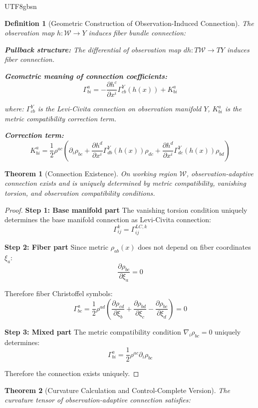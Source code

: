 \documentclass[a4paper,12pt]{extarticle}
\newtheorem{theorem}{Theorem}
\newtheorem{definition}{Definition}
\theoremstyle{definition}
\begin{document}
\begin{CJK}{UTF8}{gbsn}
\begin{definition}[Geometric Construction of Observation-Induced Connection]
The observation map $h: \mathcal{W} \to Y$ induces fiber bundle connection:

\textbf{Pullback structure:}
The differential of observation map $dh: T\mathcal{W} \to TY$ induces fiber connection.

\textbf{Geometric meaning of connection coefficients:}
$$\Gamma^a_{bi} = -\frac{\partial h^c}{\partial x^i} \Gamma^Y_{cb}(h(x)) + K^a_{bi}$$

where: $\Gamma^Y_{cb}$ is the Levi-Civita connection on observation manifold $Y$, $K^a_{bi}$ is the metric compatibility correction term.

\textbf{Correction term:}
$$K^a_{bi} = \frac{1}{2}\rho^{ac}\left(\partial_i \rho_{bc} + \frac{\partial h^d}{\partial x^i} \Gamma^Y_{db}(h(x)) \rho_{dc} + \frac{\partial h^d}{\partial x^i} \Gamma^Y_{dc}(h(x)) \rho_{bd}\right)$$
\end{definition}

\begin{theorem}[Connection Existence]
On working region $\mathcal{W}$, observation-adaptive connection exists and is uniquely determined by metric compatibility, vanishing torsion, and observation compatibility conditions.
\end{theorem}

\begin{proof}
\textbf{Step 1: Base manifold part}
The vanishing torsion condition uniquely determines the base manifold connection as Levi-Civita connection:
$$\Gamma^k_{ij} = \Gamma^{LC,k}_{ij}$$

\textbf{Step 2: Fiber part}
Since metric $\rho_{ab}(x)$ does not depend on fiber coordinates $\xi_a$:
$$\frac{\partial \rho_{bc}}{\partial \xi_a} = 0$$

Therefore fiber Christoffel symbols:
$$\Gamma^a_{bc} = \frac{1}{2}\rho^{ad}\left(\frac{\partial \rho_{cd}}{\partial \xi_b} + \frac{\partial \rho_{bd}}{\partial \xi_c} - \frac{\partial \rho_{bc}}{\partial \xi_d}\right) = 0$$

\textbf{Step 3: Mixed part}
The metric compatibility condition $\nabla_i \rho_{bc} = 0$ uniquely determines:
$$\Gamma^a_{bi} = \frac{1}{2}\rho^{ac} \partial_i \rho_{bc}$$

Therefore the connection exists uniquely.
\end{proof}

\begin{theorem}[Curvature Calculation and Control-Complete Version]
The curvature tensor of observation-adaptive connection satisfies:


\end{theorem}
\end{CJK}
\end{document}
